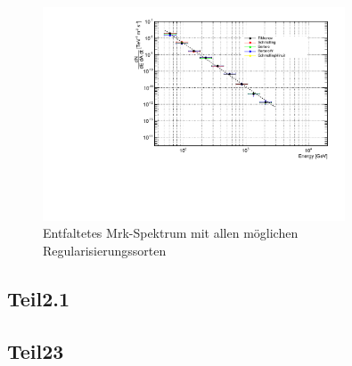 \begin{figure}
    \centering
    \includegraphics[width=0.8\textwidth]{./Plots/04_MrkAnalyse/Datenset2/Spektrum_Mrk421.pdf}
    \caption{Entfaltetes Mrk-Spektrum mit allen möglichen Regularisierungssorten}
    \label{Datenset2_CombunFold_Mrk421}
\end{figure}


\subsection{Teil2.1}

\subsection{Teil23}
